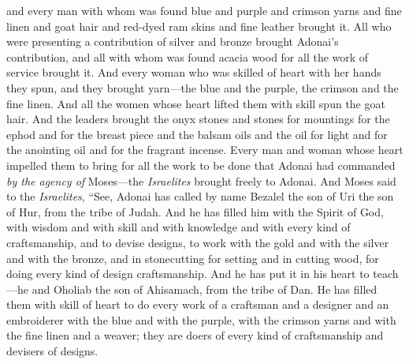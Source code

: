 \begin{biblechapter}
\verse and every man with whom was found blue and purple and crimson yarns and fine linen and goat hair and red-dyed ram skins and fine leather brought it.
\verse All who were presenting a contribution of silver and bronze brought Adonai’s contribution, and all with whom was found acacia wood for all the work of service brought it.
\verse And every woman who was skilled of heart with her hands they spun, and they brought yarn—the blue and the purple, the crimson and the fine linen.
\verse And all the women whose heart lifted them with skill spun the goat hair.
\verse And the leaders brought the onyx stones and stones for mountings for the ephod and for the breast piece
\verse and the balsam oils and the oil for light and for the anointing oil and for the fragrant incense.
\verse Every man and woman whose heart impelled them to bring for all the work to be done that Adonai had commanded \textit{by the agency of} Moses—the \textit{Israelites} brought freely to Adonai.
\verse And Moses said to the \textit{Israelites}, “See, Adonai has called by name Bezalel the son of Uri the son of Hur, from the tribe of Judah.
\verse And he has filled him with the Spirit of God, with wisdom and with skill and with knowledge and with every kind of craftsmanship,
\verse and to devise designs, to work with the gold and with the silver and with the bronze,
\verse and in stonecutting for setting and in cutting wood, for doing every kind of design craftsmanship.
\verse And he has put it in his heart to teach—he and Oholiab the son of Ahisamach, from the tribe of Dan.
\verse He has filled them with skill of heart to do every work of a craftsman and a designer and an embroiderer with the blue and with the purple, with the crimson yarns and with the fine linen and a weaver; they are doers of every kind of craftsmanship and devisers of designs.
\end{biblechapter}

